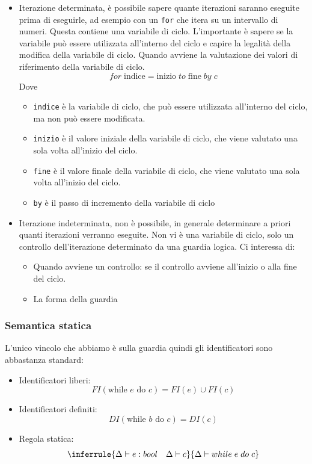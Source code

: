 \documentclass[a4paper]{article}
\begin{document}
\begin{itemize}
  \item Iterazione determinata, è possibile sapere quante 
  iterazioni saranno eseguite prima di eseguirle, ad esempio con un \texttt{for} che itera su un intervallo di numeri.
  Questa contiene una variabile di ciclo.
  L'importante è sapere se la variabile può essere utilizzata all'interno del ciclo 
  e capire la legalità della modifica della variabile di ciclo.
  Quando avviene la valutazione dei valori di riferimento 
  della variabile di ciclo.
  \[
    for \; \text{indice} = \text{inizio} \; to \; \text{fine} \; by \; c
  \]
  Dove \begin{itemize}
    \item \texttt{indice} è la variabile di ciclo, che può essere utilizzata all'interno del ciclo, ma non può essere modificata.
    \item \texttt{inizio} è il valore iniziale della variabile di ciclo, che viene valutato una sola volta all'inizio del ciclo.
    \item \texttt{fine} è il valore finale della variabile di ciclo, che viene valutato una sola volta all'inizio del ciclo.
    \item \texttt{by} è il passo di incremento della variabile di ciclo
  \end{itemize}
  \item Iterazione indeterminata, non è possibile, in generale
  determinare a priori quanti iterazioni verranno eseguite. Non vi è una variabile di ciclo,
  solo un controllo dell'iterazione determinato da una guardia logica. 
  Ci interessa di:
  \begin{itemize}
    \item Quando avviene un controllo: se il controllo avviene all'inizio o alla fine del ciclo.
    \item La forma della guardia 
  \end{itemize}
\end{itemize}

\subsubsection*{Semantica statica}

L'unico vincolo che abbiamo è sulla guardia quindi 
gli identificatori sono abbastanza standard:
\begin{itemize}
  \item Identificatori liberi:
  \[
    FI(\text{while $e$ do $c$}) = FI(e) \cup FI(c)
  \]
  \item Identificatori definiti:
  \[
    DI(\text{while $b$ do $c$}) = DI(c)
  \]
  \item Regola statica:
  \[
    \inferrule
    {\Delta \vdash e : bool \quad \Delta \vdash c}
    {\Delta \vdash while \; e \; do \; c}
  \]
\end{itemize}
\end{document}

